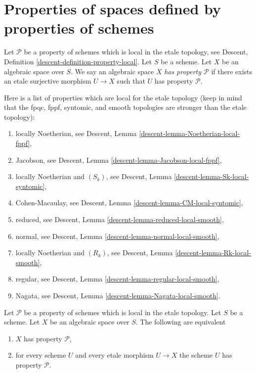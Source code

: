 \section{Properties of spaces defined by properties of schemes}
\label{section-types-properties}

\begin{definition}
\label{definition-type-property}
Let $\mathcal{P}$ be a property of schemes which is 
local in the etale topology, see
Descent, Definition \ref{descent-definition-property-local}.
Let $S$ be a scheme.
Let $X$ be an algebraic space over $S$.
We say an algebraic space $X$ {\it has property $\mathcal{P}$}
if there exists an etale surjective morphism $U \to X$ such
that $U$ has property $\mathcal{P}$.
\end{definition}

\begin{remark}
\label{remark-list-properties-local-etale-topology}
Here is a list of properties which are local for the etale topology
(keep in mind that the fpqc, fppf, syntomic, and smooth topologies are
stronger than the etale topology):
\begin{enumerate}
\item locally Noetherian, see
Descent, Lemma \ref{descent-lemma-Noetherian-local-fppf},
\item Jacobson, see
Descent, Lemma \ref{descent-lemma-Jacobson-local-fppf},
\item locally Noetherian and $(S_k)$, see
Descent, Lemma \ref{descent-lemma-Sk-local-syntomic},
\item Cohen-Macaulay, see
Descent, Lemma \ref{descent-lemma-CM-local-syntomic},
\item reduced, see
Descent, Lemma \ref{descent-lemma-reduced-local-smooth},
\item normal, see
Descent, Lemma \ref{descent-lemma-normal-local-smooth},
\item locally Noetherian and $(R_k)$, see
Descent, Lemma \ref{descent-lemma-Rk-local-smooth},
\item regular, see
Descent, Lemma \ref{descent-lemma-regular-local-smooth},
\item Nagata, see
Descent, Lemma \ref{descent-lemma-Nagata-local-smooth}.
\end{enumerate}
\end{remark}

\begin{lemma}
\label{lemma-type-property}
Let $\mathcal{P}$ be a property of schemes which is 
local in the etale topology.
Let $S$ be a scheme.
Let $X$ be an algebraic space over $S$.
The following are equivalent
\begin{enumerate}
\item $X$ has property $\mathcal{P}$,
\item for every scheme $U$ and every etale morphism $U \to X$
the scheme $U$ has property $\mathcal{P}$.
\end{enumerate}
\end{lemma}

